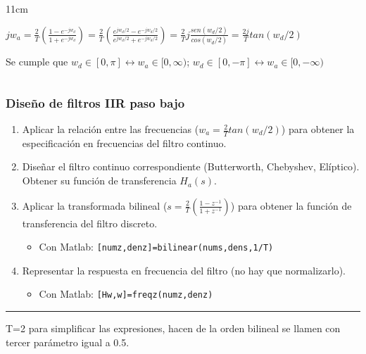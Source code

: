 \begin{frame}
\begin{itemize}
\begin{columns}[T]
\begin{column}{11cm}
\begin{itemize}
{$jw_a=\frac{2}{T}\left ( \frac{1-e^{-jw_d}}{1+e^{-jw_d}}\right)=\frac{2}{T}\left ( \frac{e^{jw_d/2}-e^{-jw_d/2}}{e^{jw_d/2}+e^{-jw_d/2}}\right)=\frac{2}{T} j \frac{sen(w_d/2)}{cos(w_d/2)}=\frac{2j}{T} tan(w_d/2)$

Se cumple que  $w_d \!\in \![0,\pi] \leftrightarrow w_a \!\in\! [0,\infty)$; $w_d  \!\in\! [0,-\pi] \leftrightarrow w_a \!\in\! [0,-\infty)$
}
\end{itemize}
\end{column}
\end{columns}

\end{itemize}

\end{frame}




\begin{frame}
\frametitle{Diseño de filtros IIR paso bajo}
\small
\begin{enumerate}
\item Aplicar la relación entre las frecuencias ($w_a=\frac{2}{T}tan(w_d/2)$) para obtener la especificación en frecuencias del filtro continuo.
\item Diseñar el filtro continuo correspondiente (Butterworth, Chebyshev, Elíptico). Obtener su función de transferencia $H_a(s)$.
\item Aplicar la transformada bilineal ($s=\frac{2}{T}\left ( \frac{1-z^{-1}}{1+z^{-1}}\right)$) para obtener la función de transferencia del filtro discreto.
\begin{itemize}
\item Con Matlab: \alert{\texttt{[numz,denz]=bilinear(nums,dens,1/T)}}
\end{itemize}

\item Representar la respuesta en frecuencia del filtro (no hay que normalizarlo).
\begin{itemize}
\item Con Matlab: \alert{\texttt{[Hw,w]=freqz(numz,denz)}}


\end{itemize}

\end{enumerate}

\rule{12cm}{0.4pt}
\footnotesize

T=2 para simplificar las expresiones, hacen de la orden bilineal se llamen con tercer parámetro igual a 0.5.

\end{frame}


